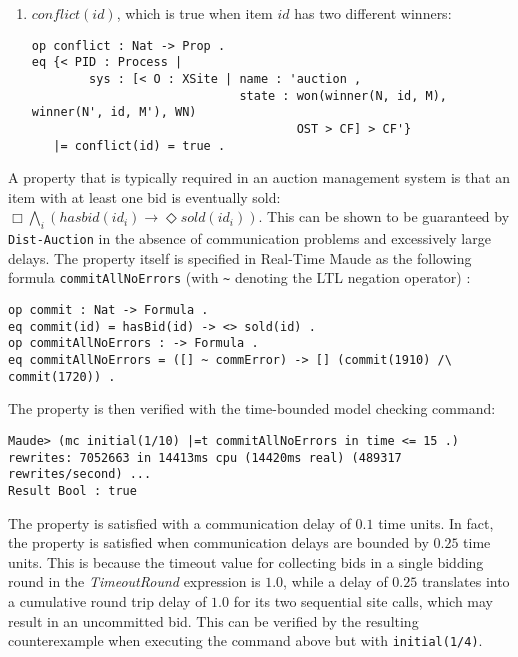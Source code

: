 \documentclass{eptcs}
\begin{document}
\begin{enumerate}
\item $\mathit{conflict}(id)$, which is true when item $id$ has two different winners:

\begin{small}
\begin{verbatim}
op conflict : Nat -> Prop .
eq {< PID : Process | 
        sys : [< O : XSite | name : 'auction , 
                             state : won(winner(N, id, M), winner(N', id, M'), WN) 
                                     OST > CF] > CF'} 
   |= conflict(id) = true .
\end{verbatim}
\end{small}

\end{enumerate}


  


A property that is typically required in an auction management system is that an item with at least one bid is eventually sold: $\Box \bigwedge_{i} (\mathit{hasbid}(id_{i}) \to \Diamond \mathit{sold}(id_{i}))$. This can be shown to be guaranteed by \texttt{Dist-Auction} in the absence of communication problems and excessively large delays. The property itself is specified in Real-Time Maude as the following formula \texttt{commitAllNoErrors} (with \texttt{\~} denoting the LTL negation operator) : 

\begin{small}
\begin{verbatim}
op commit : Nat -> Formula .
eq commit(id) = hasBid(id) -> <> sold(id) .
op commitAllNoErrors : -> Formula .
eq commitAllNoErrors = ([] ~ commError) -> [] (commit(1910) /\ commit(1720)) .
\end{verbatim}
\end{small}

The property is then verified with the time-bounded model checking command:  

\begin{small}
\begin{verbatim}
Maude> (mc initial(1/10) |=t commitAllNoErrors in time <= 15 .)
rewrites: 7052663 in 14413ms cpu (14420ms real) (489317 rewrites/second) ...
Result Bool : true
\end{verbatim}
\end{small}

\noindent The property is satisfied with a communication delay of $0.1$ time units. In fact, the property is satisfied when communication delays are bounded by $0.25$ time units. This is because the timeout value for collecting bids in a single bidding round in the \emph{TimeoutRound} expression is $1.0$, while a delay of $0.25$ translates into a cumulative round trip delay of $1.0$ for its two sequential site calls, which may result in an uncommitted bid. This can be verified by the resulting counterexample when executing the command above but with \texttt{initial(1/4)}. 
\end{document}
